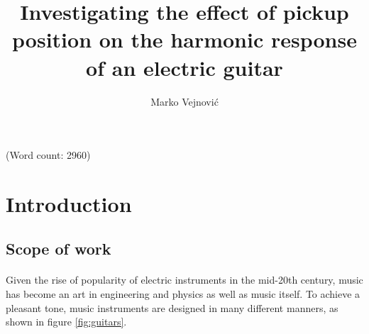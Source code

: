 \documentclass{article}
\title{Investigating the effect of pickup position on the harmonic response of 
an electric guitar}
\author{Marko Vejnovi\'{c}}
\begin{document}
\maketitle
\begin{flushright}
	(Word count: 2960)
\end{flushright}

\tableofcontents

\section{Introduction}

\subsection{Scope of work}
\paragraph*{}
Given the rise of popularity of electric instruments in the mid-20th century, 
music has become an art in engineering and physics as well as music itself. 
To achieve a pleasant tone, music instruments are designed in many different 
manners, as shown in figure \ref{fig:guitars}. 
\end{document}
